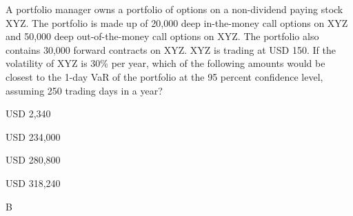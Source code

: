 \documentclass{article}
\newcounter{question} %
\begin{document}
\begin{question}
    A portfolio manager owns a portfolio of options on a non-dividend paying stock XYZ. The portfolio is made up of 20,000 deep in-the-money call options on XYZ and 50,000 deep out-of-the-money call options on XYZ. The portfolio also contains 30,000 forward contracts on XYZ. XYZ is trading at USD 150. If the volatility of XYZ is 30\% per year, which of the following amounts would be closest to the 1-day VaR of the portfolio at the 95 percent confidence level, assuming 250 trading days in a year?
\end{question}

\begin{choices}
    \item USD 2,340
    \item USD 234,000
    \item USD 280,800
    \item USD 318,240
\end{choices}

\begin{correctanswer}
    B
\end{correctanswer}
\end{document}

